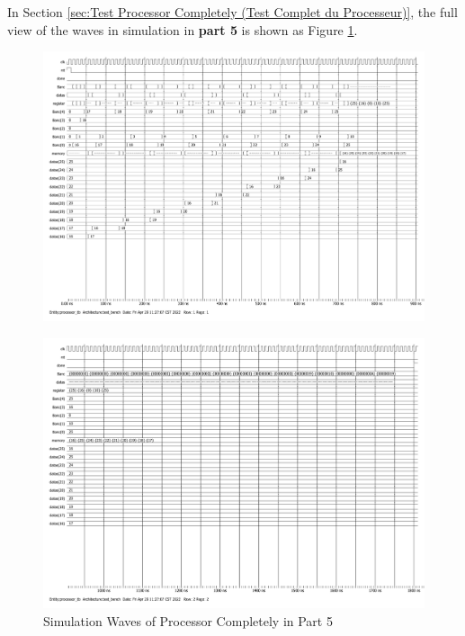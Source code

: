 \documentclass[12pt,a4paper]{article}
\begin{document}
In Section \ref{sec:Test Processor Completely (Test Complet du Processeur)}, 
the full view of the waves in simulation in \textbf{part 5} is shown 
as Figure \ref{fig:ModelSim_ processeur_tb(bench) C}.
\begin{figure}[htp]
  \centering
    \includegraphics[width=1.5\textwidth,angle = 270]{picture/ModelSim_ processeur_tb(bench) C 1.pdf}
\end{figure}

\begin{figure}[htp]
  \centering
    \includegraphics[width=1.5\textwidth,angle = 270]{picture/ModelSim_ processeur_tb(bench) C 2.pdf}
    \caption{Simulation Waves of Processor Completely in Part 5}  
  \label{fig:ModelSim_ processeur_tb(bench) C}
\end{figure}
\end{document}
